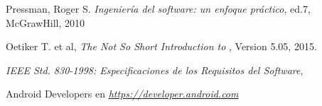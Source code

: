 \begin{thebibliography}{99} %
	
	Pressman, Roger S.
	\emph{Ingeniería del software: un enfoque práctico},
	ed.7,
	McGrawHill,
	2010
	
	Oetiker T. et al,
	\emph{The Not So Short Introduction to \LaTeXe},
	Version 5.05,
	2015.
	
	\emph{IEEE Std. 830-1998: Especificaciones de los Requisitos del Software},
	
	Android Developers en
	\emph{\url{https://developer.android.com}}
	
\end{thebibliography}